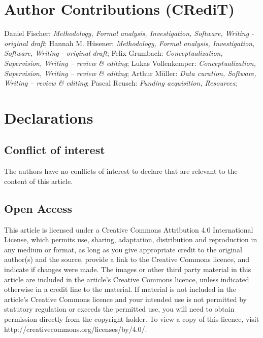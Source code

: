 \section*{Author Contributions (CRediT)}

Daniel Fischer: \textit{Methodology, Formal analysis, Investigation, Software, Writing - original draft};
Hannah M. Hüsener: \textit{Methodology, Formal analysis, Investigation, Software, Writing - original draft};
Felix Grumbach: \textit{Conceptualization, Supervision, Writing – review \& editing};
Lukas Vollenkemper: \textit{Conceptualization, Supervision, Writing – review \& editing};
Arthur Müller: \textit{Data curation, Software, Writing – review \& editing};
Pascal Reusch: \textit{Funding acquisition, Resources};

\section*{Declarations}
\subsection*{Conflict of interest}
The authors have no conflicts of interest to declare that are relevant to the content of this article.

\subsection*{Open Access}
This article is licensed under a Creative Commons Attribution 4.0 International License, which permits use, sharing, adaptation, distribution and reproduction in any medium or format, as long as you give appropriate credit to the original author(s) and the source, provide a link to the Creative Commons licence, and indicate if changes were made. The images or other third party material in this article are included in the article’s Creative Commons licence, unless indicated otherwise in a credit line to the material. If material is not included in the article’s Creative Commons licence and your intended use is not permitted by statutory regulation or exceeds the permitted use, you will need to obtain permission directly from the copyright holder. To view a copy of this licence, visit http://creativecommons.org/licenses/by/4.0/.